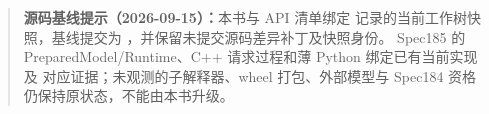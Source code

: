 \newcommand{\DesignKind}{当前设计}



\begin{quote}
\textbf{源码基线提示（2026-09-15）：}本书与 API 清单绑定
 记录的当前工作树快照，基线提交为
\texttt{\SourceBaseline}，并保留未提交源码差异补丁及快照身份。
Spec185 的 PreparedModel/Runtime、C++ 请求过程和薄 Python 绑定已有当前实现及
对应证据；未观测的子解释器、wheel 打包、外部模型与 Spec184 资格仍保持原状态，不能由本书升级。
\end{quote}
\tableofcontents
\clearpage




